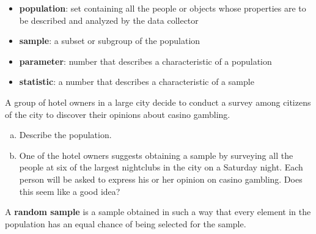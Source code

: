 \documentclass[12pt, letterpaper]{article}
\newcounter{exercise}
\theoremstyle{definition}
\begin{document}
\newpage

\begin{tcolorbox}
\begin{itemize}
\item \textbf{population}:  set containing all the people or objects whose properties are to be described and analyzed by the data collector
\item \textbf{sample}:  a subset or subgroup of the population
\end{itemize}
\end{tcolorbox}

\begin{tcolorbox}
\begin{itemize}
\item \textbf{parameter}:  number that describes a characteristic of a population
\item \textbf{statistic}:  a number that describes a characteristic of a sample
\end{itemize}
\end{tcolorbox}

\begin{exercise}  A group of hotel owners in a large city decide to conduct a survey among citizens of the city to discover their opinions about casino gambling.

\begin{enumerate}[(a)]
\item Describe the population.


\item One of the hotel owners suggests obtaining a sample by surveying all the people at six of the largest nightclubs in the city on a Saturday night.  Each person will be asked to express his or her opinion on casino gambling.  Does this seem like a good idea?



\end{enumerate}
\end{exercise}

\vfill


\begin{tcolorbox}
A \textbf{random sample} is a sample obtained in such a way that every element in the population has an equal chance of being selected for the sample.
\end{tcolorbox}
\end{document}

